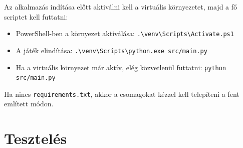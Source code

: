 \documentclass[]{thesis-ekf}
\begin{document}
	Az alkalmazás indítása előtt aktiválni kell a virtuális környezetet, majd a fő scriptet kell futtatni:
	\begin{itemize}
		\item PowerShell-ben a környezet aktiválása: \texttt{.\textbackslash venv\textbackslash Scripts\textbackslash Activate.ps1}
		\item A játék elindítása: \texttt{.\textbackslash venv\textbackslash Scripts\textbackslash python.exe src/main.py}
		\item Ha a virtuális környezet már aktív, elég közvetlenül futtatni: \texttt{python src/main.py}
	\end{itemize}
	
	Ha nincs \texttt{requirements.txt}, akkor a csomagokat kézzel kell telepíteni a fent említett módon.
	
	\chapter{Tesztelés}
	
\end{document}
